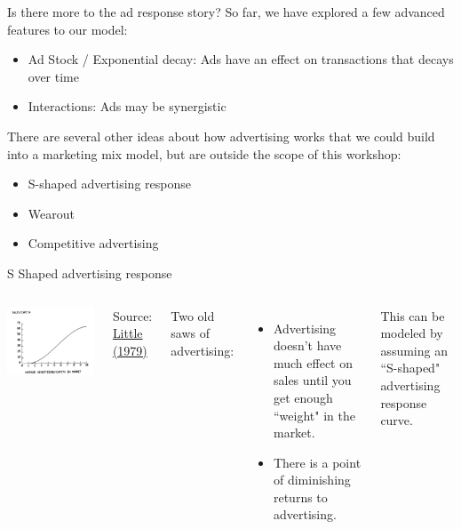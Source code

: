 \documentclass[10pt, aspectratio=169]{beamer}
\newcommand{\source}[1]{\begin{flushright} \footnotesize Source: {#1} \end{flushright} \normalsize}
\begin{document}
\begin{frame}{Is there more to the ad response story?}
So far, we have explored a few advanced features to our model: 
\begin{itemize}
\item \alert{Ad Stock / Exponential decay}: Ads have an effect on transactions that decays over time
\item \alert{Interactions}: Ads may be synergistic
\end{itemize}
\bigskip \pause
There are several other ideas about how advertising works that we could build into a marketing mix model, but are outside the scope of this workshop: 
\begin{itemize}
\item \alert{S-shaped advertising response}
\item \alert{Wearout}
\item \alert{Competitive advertising}
\end{itemize}
\end{frame} 

\begin{frame}{S Shaped advertising response}
\begin{columns}
\includegraphics[width=\textwidth]{images/sshapedadresponse.png}
\source{\href{https://drive.google.com/uc?export=download&id=0B0EzanlzLNsWZkE1TWtNNVpBUzA}{Little (1979)}}
Two old saws of advertising: 
\begin{itemize} 
\item Advertising doesn't have much effect on sales until you get enough ``weight" in the market. 
\item There is a point of \alert{diminishing returns} to advertising. 
\end{itemize}
This can be modeled by assuming an ``S-shaped" advertising response curve. 
\end{columns}
\end{frame}
\end{document}
